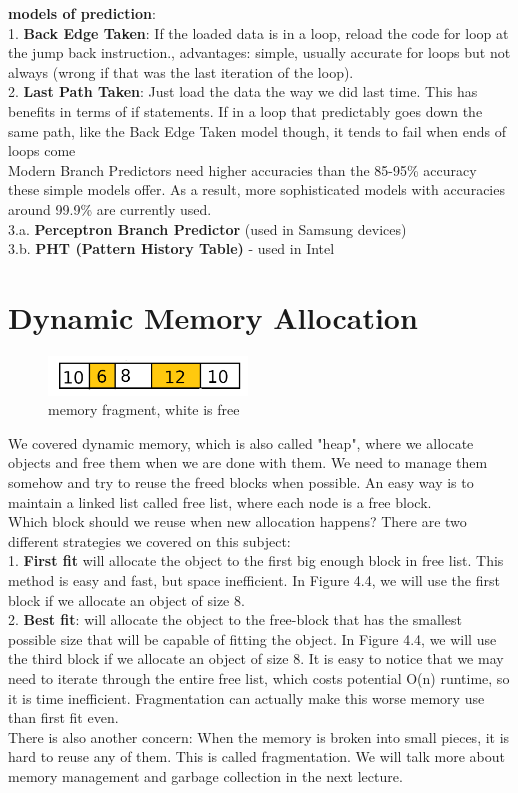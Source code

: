 \documentclass[twoside]{article}
\begin{document}
\large \textbf{models of prediction}:\normalsize\\
1. \textbf{Back Edge Taken}: If the loaded data is in a loop, reload the code for loop at the jump back instruction., advantages: simple, usually accurate for loops but not always (wrong if that was the last iteration of the loop).\\
2. \textbf{Last Path Taken}: Just load the data the way we did last time. This has benefits in terms of if statements. If in a loop that predictably goes down the same path, like the Back Edge Taken model though, it tends to fail when ends of loops come \\
Modern Branch Predictors need higher accuracies than the 85-95\% accuracy these simple models offer. As a result, more sophisticated models with accuracies around 99.9\% are currently used.\\
3.a. \textbf{Perceptron Branch Predictor} (used in Samsung devices)\\
3.b. \textbf{PHT (Pattern History Table)} - used in Intel\\

\section{Dynamic Memory Allocation}

\begin{figure}[ht!] %
\centering
  \includegraphics[width=200px]{memory_fragmentation.png}
  \caption{memory fragment, white is free}
  \label{fig:fig4}
\end{figure}

We covered dynamic memory, which is also called "heap", where we allocate objects and free them when we are done with them. We need to manage them somehow and try to reuse the freed blocks when possible. An easy way is to maintain a linked list called free list, where each node is a free block.\\

Which block should we reuse when new allocation happens? There are two different strategies we covered on this subject:\\
1. \textbf{First fit} will allocate the object to the first big enough block in free list. This method is easy and fast, but space inefficient. In Figure 4.4, we will use the first block if we allocate an object of size 8.\\
2. \textbf{Best fit}: will allocate the object to the free-block that has the smallest possible size that  will be capable of fitting the object. In Figure 4.4, we will use the third block if we allocate an object of size 8. It is easy to notice that we may need to iterate through the entire free list, which costs potential O(n) runtime, so it is time inefficient. Fragmentation can actually make this worse memory use than first fit even.\\

There is also another concern: When the memory is broken into small pieces, it is hard to reuse any of them. This is called fragmentation. We will talk more about memory management and garbage collection in the next lecture.
\end{document}
